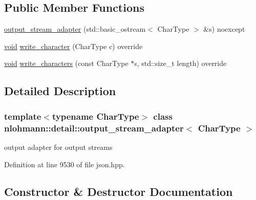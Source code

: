 \subsection*{Public Member Functions}
\begin{DoxyCompactItemize}
\item 
\mbox{\hyperlink{classnlohmann_1_1detail_1_1output__stream__adapter_ae44ed343cb1a716248547f48dd045b6a}{output\+\_\+stream\+\_\+adapter}} (std\+::basic\+\_\+ostream$<$ Char\+Type $>$ \&s) noexcept
\item 
\mbox{\hyperlink{namespacenlohmann_1_1detail_a59fca69799f6b9e366710cb9043aa77d}{void}} \mbox{\hyperlink{classnlohmann_1_1detail_1_1output__stream__adapter_a6e2698c76b200b2d8fac6cebfc43a245}{write\+\_\+character}} (Char\+Type c) override
\item 
\mbox{\hyperlink{namespacenlohmann_1_1detail_a59fca69799f6b9e366710cb9043aa77d}{void}} \mbox{\hyperlink{classnlohmann_1_1detail_1_1output__stream__adapter_ad61375497a7d03cb0bdcddfdaad185d0}{write\+\_\+characters}} (const Char\+Type $\ast$s, std\+::size\+\_\+t length) override
\end{DoxyCompactItemize}


\subsection{Detailed Description}
\subsubsection*{template$<$typename Char\+Type$>$\newline
class nlohmann\+::detail\+::output\+\_\+stream\+\_\+adapter$<$ Char\+Type $>$}

output adapter for output streams 

Definition at line 9530 of file json.\+hpp.



\subsection{Constructor \& Destructor Documentation}
\mbox{\label{classnlohmann_1_1detail_1_1output__stream__adapter_ae44ed343cb1a716248547f48dd045b6a}} 
